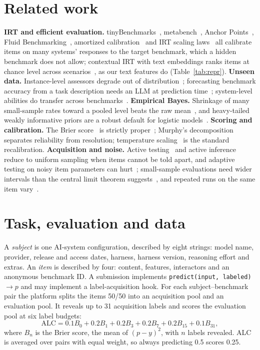 \documentclass{article}
\begin{document}
\section{Related work}\label{sec:related}
\textbf{IRT and efficient evaluation.} tinyBenchmarks~\cite{polo2024}, metabench~\cite{kipnis2025}, Anchor
Points~\cite{vivek2024}, Fluid Benchmarking~\cite{hofmann2025}, amortized calibration~\cite{truong2025} and IRT scaling
laws~\cite{truong2026irsl} all calibrate items on many systems' responses to the target benchmark, which a hidden
benchmark does not allow; contextual IRT with text embeddings ranks items at chance level across
scenarios~\cite{shang2026}, as our text features do (Table~\ref{tab:repr}). \textbf{Unseen data.} Instance-level
assessors degrade out of distribution~\cite{pacchiardi2024,pacchiardi2025}; forecasting benchmark accuracy from a task
description needs an LLM at prediction time~\cite{park2025}; system-level abilities do transfer across
benchmarks~\cite{ruan2024}. \textbf{Empirical Bayes.} Shrinkage of many small-sample rates toward a pooled level beats
the raw mean~\cite{efron1975,brown2008}, and heavy-tailed weakly informative priors are a robust default for logistic
models~\cite{gelman2008}. \textbf{Scoring and calibration.} The Brier score~\cite{brier1950} is strictly
proper~\cite{gneiting2007}; Murphy's decomposition~\cite{murphy1973} separates reliability from resolution; temperature
scaling~\cite{guo2017} is the standard recalibration. \textbf{Acquisition and noise.} Active testing~\cite{kossen2021}
and active inference~\cite{zrnic2024} reduce to uniform sampling when items cannot be told apart, and adaptive testing
on noisy item parameters can hurt~\cite{vanderlinden2000}; small-sample evaluations need wider intervals than the
central limit theorem suggests~\cite{bowyer2025,miller2024}, and repeated runs on the same item vary~\cite{wang2025}.

\section{Task, evaluation and data}\label{sec:task}
A \emph{subject} is one AI-system configuration, described by eight strings: model name, provider, release and access
dates, harness, harness version, reasoning effort and extras. An \emph{item} is described by four: content, features,
interactors and an anonymous benchmark ID. A submission implements \texttt{predict(input, labeled)}~$\to p$ and may
implement a label-acquisition hook. For each subject--benchmark pair the platform splits the items 50/50 into an
acquisition pool and an evaluation pool.\enlargethispage{\baselineskip} It reveals up to 31 acquisition labels and scores the evaluation pool at six
label budgets:
\begin{equation}
\mathrm{ALC} = 0.1B_0 + 0.2B_1 + 0.2B_3 + 0.2B_7 + 0.2B_{15} + 0.1B_{31},
\end{equation}
where $B_n$ is the Brier score, the mean of $(p-y)^2$, with $n$ labels revealed.
ALC is averaged over pairs with equal weight, so always predicting 0.5 scores 0.25.
\end{document}
